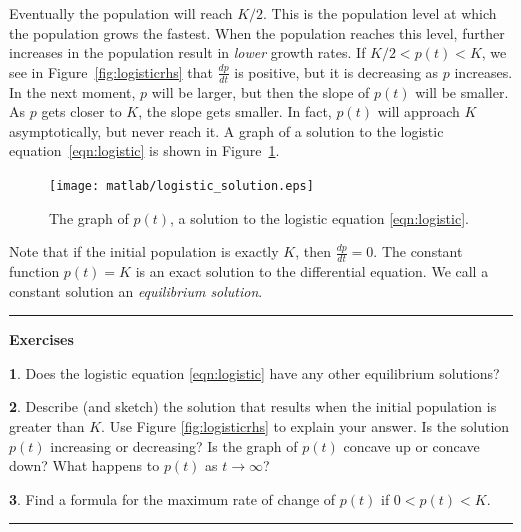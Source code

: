 \documentclass[reqno]{immbook}
\numberwithin{equation}{chapter}
\numberwithin{question}{section}
\numberwithin{theorem}{chapter}
\numberwithin{figure}{chapter}
\theoremstyle{definition}
\newtheorem{exercise}{}[section]
\newenvironment{exercises}%
{%
\medskip\hrule\medskip\noindent\textbf{Exercises}%
}%
{%
\medskip\hrule
}
\begin{document}
Eventually the population will reach $K/2$.  This is the population
level at which the population grows the fastest.
When the population reaches this level, further increases in the
population result in \emph{lower} growth rates.
If $K/2 < p(t) < K$, we see in
Figure~\ref{fig:logisticrhs} that $\frac{dp}{dt}$ is positive, but it is
decreasing as $p$ increases.  In the next moment, $p$ will be larger,
but then the slope of $p(t)$ will be smaller.
As $p$ gets closer to $K$, the slope gets smaller.
In fact, $p(t)$ will approach $K$ asymptotically, but never reach it.
A graph of a solution to the logistic equation~\eqref{eqn:logistic} is
shown in Figure~\ref{fig:logisticsol}.
\begin{figure}
\centerline{\texttt{[image: matlab/logistic\_solution.eps]}} 
\caption{The graph of $p(t)$, a solution to the logistic
equation \eqref{eqn:logistic}.}
\label{fig:logisticsol}
\end{figure}


Note that if the initial population is exactly $K$, then
$\frac{dp}{dt} = 0$.  The constant function $p(t)=K$ is an
exact solution to the differential equation.
We call a constant solution an
\emph{equilibrium solution}.

\newpage

\begin{exercises}
\begin{exercise}
Does the logistic equation \eqref{eqn:logistic} have any other
equilibrium solutions?
\end{exercise}
\begin{exercise}
Describe (and sketch) the solution that
results when the initial population is greater than $K$.
Use Figure \ref{fig:logisticrhs} to explain your answer.
Is the solution $p(t)$ increasing or decreasing?
Is the graph of $p(t)$ concave up or concave down?
What happens to $p(t)$ as $t\rightarrow\infty$?
\end{exercise}
\begin{exercise}
Find a formula for the maximum rate of change
of $p(t)$ if $0 < p(t) < K$.
\end{exercise}
\end{exercises}

\newpage
\end{document}
